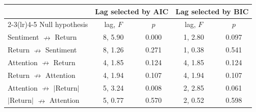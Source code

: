 \begin{tabular}{lcccc}
\toprule
 & \multicolumn{2}{c}{Lag selected by AIC} & \multicolumn{2}{c}{Lag selected by BIC} \\
\cmidrule(lr){2-3}\cmidrule(lr){4-5}
Null hypothesis & lag, $F$ & $p$ & lag, $F$ & $p$ \\
\midrule
Sentiment $\nrightarrow$ Return & 8, 5.90 & 0.000 & 1, 2.80 & 0.097 \\
Return $\nrightarrow$ Sentiment & 8, 1.26 & 0.271 & 1, 0.38 & 0.541 \\
Attention $\nrightarrow$ Return & 4, 1.85 & 0.124 & 4, 1.85 & 0.124 \\
Return $\nrightarrow$ Attention & 4, 1.94 & 0.107 & 4, 1.94 & 0.107 \\
Attention $\nrightarrow$ $|$Return$|$ & 5, 3.24 & 0.008 & 2, 2.85 & 0.061 \\
$|$Return$|$ $\nrightarrow$ Attention & 5, 0.77 & 0.570 & 2, 0.52 & 0.598 \\
\bottomrule
\end{tabular}
